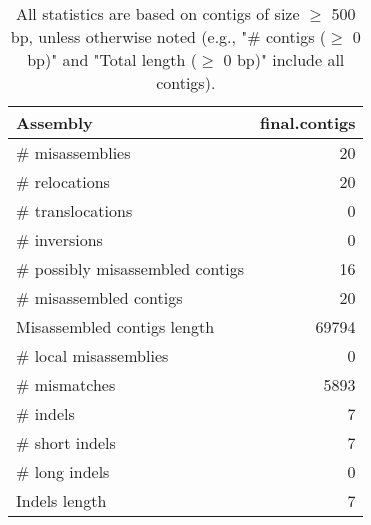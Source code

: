 \documentclass[12pt,a4paper]{article}
\begin{document}
\begin{table}[ht]
\begin{center}
\caption{All statistics are based on contigs of size $\geq$ 500 bp, unless otherwise noted (e.g., "\# contigs ($\geq$ 0 bp)" and "Total length ($\geq$ 0 bp)" include all contigs).}
\begin{tabular}{|l*{1}{|r}|}
\hline
Assembly & final.contigs \\ \hline
\# misassemblies & 20 \\ \hline
\hspace{5mm}\# relocations & 20 \\ \hline
\hspace{5mm}\# translocations & 0 \\ \hline
\hspace{5mm}\# inversions & 0 \\ \hline
\# possibly misassembled contigs & 16 \\ \hline
\# misassembled contigs & 20 \\ \hline
Misassembled contigs length & 69794 \\ \hline
\# local misassemblies & 0 \\ \hline
\# mismatches & 5893 \\ \hline
\# indels & 7 \\ \hline
\hspace{5mm}\# short indels & 7 \\ \hline
\hspace{5mm}\# long indels & 0 \\ \hline
Indels length & 7 \\ \hline
\end{tabular}
\end{center}
\end{table}
\end{document}
